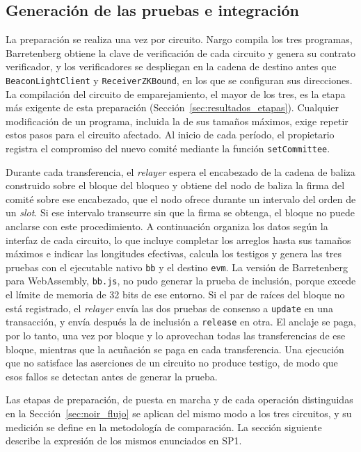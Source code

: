 \subsection{Generación de las pruebas e integración}
\label{sec:noir_impl_integracion}

La preparación se realiza una vez por circuito. Nargo compila los tres programas, Barretenberg
obtiene la clave de verificación de cada circuito y genera su contrato verificador, y los
verificadores se despliegan en la cadena de destino antes que \texttt{BeaconLightClient} y
\texttt{ReceiverZKBound}, en los que se configuran sus direcciones. La compilación del circuito de
emparejamiento, el mayor de los tres, es la etapa más exigente de esta preparación
(Sección~\ref{sec:resultados_etapas}). Cualquier modificación de un programa, incluida la de sus
tamaños máximos, exige repetir estos pasos para el circuito afectado. Al inicio de cada período,
el propietario registra el compromiso del nuevo comité mediante la función
\lstinline|setCommittee|.

Durante cada transferencia, el \textit{relayer} espera el encabezado de la cadena de baliza
construido sobre el bloque del bloqueo y obtiene del nodo de baliza la firma del comité sobre ese
encabezado, que el nodo ofrece durante un intervalo del orden de un \textit{slot}. Si ese intervalo
transcurre sin que la firma se obtenga, el bloque no puede anclarse con este procedimiento. A
continuación organiza los datos según la interfaz de cada circuito, lo que incluye completar los
arreglos hasta sus tamaños máximos e indicar las longitudes efectivas, calcula los testigos y
genera las tres pruebas con el ejecutable nativo \texttt{bb} y el destino \lstinline|evm|. La
versión de Barretenberg para WebAssembly, \texttt{bb.js}, no pudo generar la prueba de inclusión,
porque excede el límite de memoria de 32 bits de ese entorno. Si el par de raíces del bloque no
está registrado, el \textit{relayer} envía las dos pruebas de consenso a \lstinline|update| en una
transacción, y envía después la de inclusión a \lstinline|release| en otra. El anclaje se paga,
por lo tanto, una vez por bloque y lo aprovechan todas las transferencias de ese bloque, mientras
que la acuñación se paga en cada transferencia. Una ejecución que no satisface las aserciones de
un circuito no produce testigo, de modo que esos fallos se detectan antes de generar la prueba.

Las etapas de preparación, de puesta en marcha y de cada operación distinguidas en la
Sección~\ref{sec:noir_flujo} se aplican del mismo modo a los tres circuitos, y su medición se
define en la metodología de comparación. La sección siguiente describe la expresión de los mismos
enunciados en SP1.
